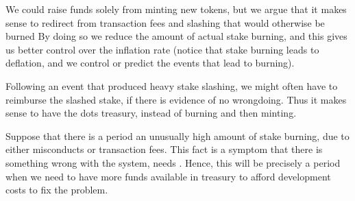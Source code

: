 We could raise funds solely from minting new tokens, but we argue that it makes sense to redirect  from transaction fees and slashing that would otherwise be burned
By doing so\eray{}{,} we reduce the amount of actual stake burning, and this gives us better control over the inflation rate (notice that stake burning leads to deflation, and we  control or predict the events that lead to burning).

Following an event that produced heavy stake slashing, we might often have to reimburse the slashed stake, if there is evidence of no wrongdoing. Thus\eray{}{,} it makes sense to have the dots  treasury, instead of burning and then minting.

Suppose that there is a period  an unusually high amount of stake burning, due to either misconducts or transaction fees. This fact is a symptom that there is something wrong with the system,  needs . Hence, this will be precisely a period when we need to have more funds available in  treasury to afford   development costs to fix the problem.

